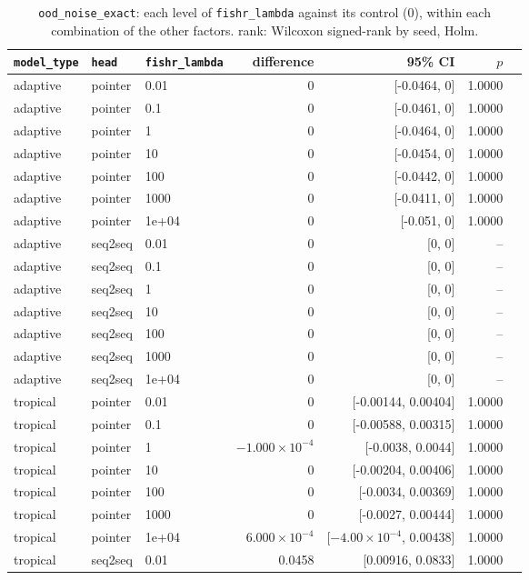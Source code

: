 \documentclass[10pt]{article}
\begin{document}
{\small
\begin{longtable}{lllrrrl}
\caption{\texttt{ood\_noise\_exact}: each level of \texttt{fishr\_lambda} against its control (0), within each combination of the other factors. rank: Wilcoxon signed-rank by seed, Holm.}\label{tab:control-ood_noise_exact}\\
\toprule
\texttt{model\_type} & \texttt{head} & \texttt{fishr\_lambda} & difference & 95\% CI & $p$ & \\
\midrule
\endhead
adaptive & pointer & 0.01 & 0 & [-0.0464, 0] & 1.0000 & \\
adaptive & pointer & 0.1 & 0 & [-0.0461, 0] & 1.0000 & \\
adaptive & pointer & 1 & 0 & [-0.0464, 0] & 1.0000 & \\
adaptive & pointer & 10 & 0 & [-0.0454, 0] & 1.0000 & \\
adaptive & pointer & 100 & 0 & [-0.0442, 0] & 1.0000 & \\
adaptive & pointer & 1000 & 0 & [-0.0411, 0] & 1.0000 & \\
adaptive & pointer & 1e+04 & 0 & [-0.051, 0] & 1.0000 & \\
adaptive & seq2seq & 0.01 & 0 & [0, 0] & -- & \\
adaptive & seq2seq & 0.1 & 0 & [0, 0] & -- & \\
adaptive & seq2seq & 1 & 0 & [0, 0] & -- & \\
adaptive & seq2seq & 10 & 0 & [0, 0] & -- & \\
adaptive & seq2seq & 100 & 0 & [0, 0] & -- & \\
adaptive & seq2seq & 1000 & 0 & [0, 0] & -- & \\
adaptive & seq2seq & 1e+04 & 0 & [0, 0] & -- & \\
tropical & pointer & 0.01 & 0 & [-0.00144, 0.00404] & 1.0000 & \\
tropical & pointer & 0.1 & 0 & [-0.00588, 0.00315] & 1.0000 & \\
tropical & pointer & 1 & $-1.000\times10^{-4}$ & [-0.0038, 0.0044] & 1.0000 & \\
tropical & pointer & 10 & 0 & [-0.00204, 0.00406] & 1.0000 & \\
tropical & pointer & 100 & 0 & [-0.0034, 0.00369] & 1.0000 & \\
tropical & pointer & 1000 & 0 & [-0.0027, 0.00444] & 1.0000 & \\
tropical & pointer & 1e+04 & $6.000\times10^{-4}$ & [$-4.00\times10^{-4}$, 0.00438] & 1.0000 & \\
tropical & seq2seq & 0.01 & 0.0458 & [0.00916, 0.0833] & 1.0000 & \\

\end{longtable}}
\end{document}

